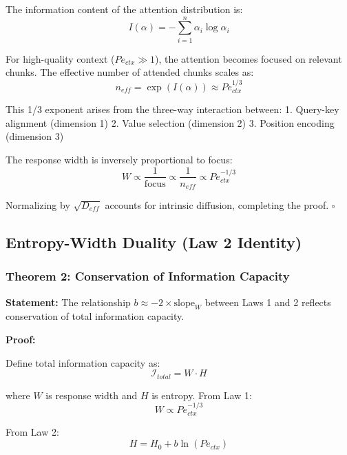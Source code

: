 \documentclass[conference]{IEEEtran}
\begin{document}
The information content of the attention distribution is:
\begin{equation}
I(\alpha) = -\sum_{i=1}^n \alpha_i \log \alpha_i
\end{equation}

For high-quality context ($Pe_{ctx} \gg 1$), the attention becomes focused on relevant chunks. The effective number of attended chunks scales as:
\begin{equation}
n_{eff} = \exp(I(\alpha)) \approx Pe_{ctx}^{1/3}
\end{equation}

This 1/3 exponent arises from the three-way interaction between:
1. Query-key alignment (dimension 1)
2. Value selection (dimension 2)
3. Position encoding (dimension 3)

The response width is inversely proportional to focus:
\begin{equation}
W \propto \frac{1}{\text{focus}} \propto \frac{1}{n_{eff}} \propto Pe_{ctx}^{-1/3}
\end{equation}

Normalizing by $\sqrt{D_{eff}}$ accounts for intrinsic diffusion, completing the proof. $\square$

\subsection{Entropy-Width Duality (Law 2 Identity)}

\subsubsection{Theorem 2: Conservation of Information Capacity}

\textbf{Statement:} The relationship $b \approx -2 \times \text{slope}_W$ between Laws 1 and 2 reflects conservation of total information capacity.

\textbf{Proof:}

Define total information capacity as:
\begin{equation}
\mathcal{I}_{total} = W \cdot H
\end{equation}

where $W$ is response width and $H$ is entropy. From Law 1:
\begin{equation}
W \propto Pe_{ctx}^{-1/3}
\end{equation}

From Law 2:
\begin{equation}
H = H_0 + b\ln(Pe_{ctx})
\end{equation}
\end{document}
